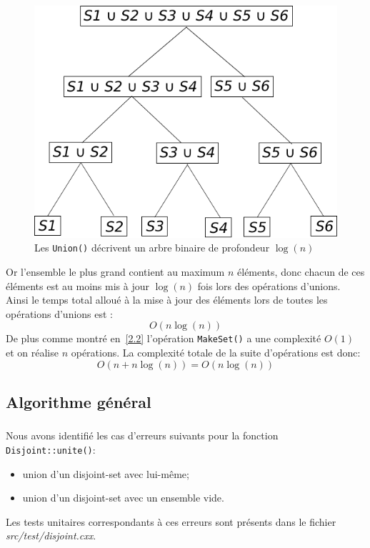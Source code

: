 \documentclass[10pt,a4paper]{article}
\begin{document}
{{\begin{figure}
\centering
\includegraphics[scale=0.5]{3-5.pdf}
\caption{Les \texttt{Union()} décrivent un arbre binaire de profondeur $\log(n)$}
\label{fig:tree}
\end{figure}

Or l'ensemble le plus grand contient au maximum $n$ éléments, donc chacun de ces éléments est au moins mis à jour $\log(n)$ fois lors des opérations d'unions. Ainsi le temps total alloué à la mise à jour des éléments lors de toutes les opérations d'unions est : 
$$O(n\log(n))$$
De plus comme montré en~\ref{2.2} l'opération \texttt{MakeSet()} a une complexité $O(1)$ et on réalise $n$ opérations.
La complexité totale de la suite d'opérations est donc:
$$O(n+n\log(n)) = O(n\log(n))$$

\subsection{Algorithme général}
\subsubsection{}
Nous avons identifié les cas d'erreurs suivants pour la fonction \texttt{Disjoint::unite()}:
\begin{itemize}
\itemsep0em 
\item union d'un disjoint-set avec lui-même;
\item union d'un disjoint-set avec un ensemble vide.
\end{itemize}
Les tests unitaires correspondants à ces erreurs sont présents dans le fichier \textit{src/test/disjoint.cxx}.

}}
\end{document}
